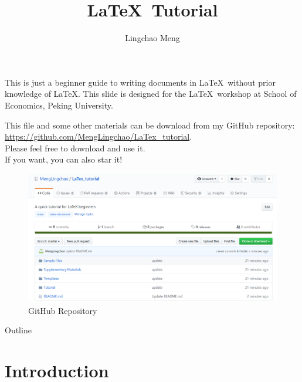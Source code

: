 \documentclass[11pt]{beamer}
\begin{document}
	
	\begin{CJK*}{UTF8}{gkai}
		
	\author[LC Meng]{Lingchao Meng}
	\title[LaTeX Tutorial]{\LaTeX\ Tutorial}

\begin{frame}
    \maketitle
\end{frame}

\begin{frame}
	This is  just a beginner guide to writing documents in \LaTeX\ without prior knowledge of \LaTeX. This slide is designed for the \LaTeX\ workshop at School of Economics, Peking University.
\end{frame}

\begin{frame}
	This file and some other materials can be download from my GitHub repository: \underline{https://github.com/MengLingchao/LaTex\_tutorial}. \\Please feel free to download and use it.\\
	If you want, you can also star it!
	\begin{figure}
		\centering
		\includegraphics[width=0.7\linewidth]{figs/GitHub}
		\caption{GitHub Repository}
		\label{fig:github}
	\end{figure}
	
\end{frame}

\begin{frame}{Outline}
	\tableofcontents
\end{frame}

\section{Introduction}
\begin{frame}
	\sectionpage
\end{frame}


\end{CJK*}
\end{document}
